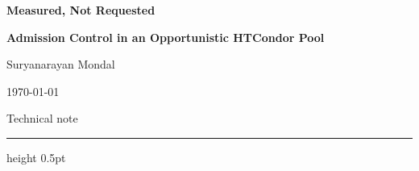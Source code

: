 \documentclass[11pt,a4paper]{article}
\begin{document}
\hypersetup{pageanchor=false}

\begin{center}
{\LARGE\bfseries Measured, Not Requested\par}
\vspace{0.45em}
{\large\bfseries Admission Control in an Opportunistic HTCondor Pool\par}
\vspace{1.0em}
{\large Suryanarayan Mondal\par}
\vspace{0.35em}
{\normalsize\today\par}
\vspace{0.4em}
{\footnotesize\color{RuleGrey}Technical note\par}
\end{center}

\vspace{0.6em}
{\color{RuleGrey}\hrule height 0.5pt}
\vspace{1.1em}
\end{document}
